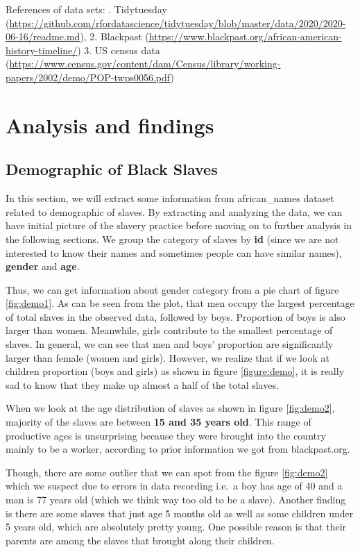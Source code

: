 \documentclass[
]{article}
\begin{document}
References of data sets:
. Tidytuesday (\url{https://github.com/rfordatascience/tidytuesday/blob/master/data/2020/2020-06-16/readme.md}),
2. Blackpast (\url{https://www.blackpast.org/african-american-history-timeline/})
3. US census data (\url{https://www.census.gov/content/dam/Census/library/working-papers/2002/demo/POP-twps0056.pdf})

\hypertarget{analysis-and-findings}{%
\section{Analysis and findings}\label{analysis-and-findings}}

\hypertarget{demographic-of-black-slaves}{%
\subsection{Demographic of Black Slaves}\label{demographic-of-black-slaves}}

In this section, we will extract some information from african\_names dataset related to demographic of slaves. By extracting and analyzing the data, we can have initial picture of the slavery practice before moving on to further analysis in the following sections. We group the category of slaves by \textbf{id} (since we are not interested to know their names and sometimes people can have similar names), \textbf{gender} and \textbf{age}.

Thus, we can get information about gender category from a pie chart of figure \ref{fig:demo1}. As can be seen from the plot, that men occupy the largest percentage of total slaves in the observed data, followed by boys. Proportion of boys is also larger than women. Meanwhile, girls contribute to the smallest percentage of slaves. In general, we can see that men and boys' proportion are significantly larger than female (women and girls). However, we realize that if we look at children proportion (boys and girls) as shown in figure \ref{figure:demo}, it is really sad to know that they make up almost a half of the total slaves.

When we look at the age distribution of slaves as shown in figure \ref{fig:demo2}, majority of the slaves are between \textbf{15 and 35 years old}. This range of productive ages is unsurprising because they were brought into the country mainly to be a worker, according to prior information we got from blackpast.org.

Though, there are some outlier that we can spot from the figure \ref{fig:demo2} which we suspect due to errors in data recording i.e.~a boy has age of 40 and a man is 77 years old (which we think way too old to be a slave). Another finding is there are some slaves that just age 5 months old as well as some children under 5 years old, which are absolutely pretty young. One possible reason is that their parents are among the slaves that brought along their children.
\end{document}

